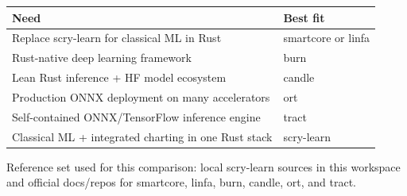\documentclass[10pt]{article}
\begin{document}
\vspace{0.2em}
\begin{tabular}{p{4.25in} p{5.75in}}
\toprule
\textbf{Need} & \textbf{Best fit} \\
\midrule
Replace scry-learn for classical ML in Rust & smartcore or linfa \\
Rust-native deep learning framework & burn \\
Lean Rust inference + HF model ecosystem & candle \\
Production ONNX deployment on many accelerators & ort \\
Self-contained ONNX/TensorFlow inference engine & tract \\
Classical ML + integrated charting in one Rust stack & scry-learn \\
\bottomrule
\end{tabular}

\vspace{0.6em}
\footnotesize
Reference set used for this comparison: local scry-learn sources in this workspace and official docs/repos for smartcore, linfa, burn, candle, ort, and tract.
\end{document}
